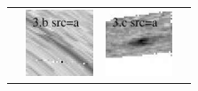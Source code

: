 \documentclass[useAMS,usenatbib]{mn2e}
\begin{document}
\begin{table}
\begin{tabular}{cccc}
    & \multicolumn{1}{m{1.7cm}}{\includegraphics[height=2.00cm,clip]{figs/enfw_img/eA1689_F850LPa.pre_3_b_a_tri.ps}}
    & \multicolumn{1}{m{1.7cm}}{\includegraphics[height=2.00cm,clip]{figs/enfw_img/eA1689_F850LPa.pre_3_c_a_tri.ps}} \\
  \end{tabular}

\end{table}

\clearpage
\end{document}
